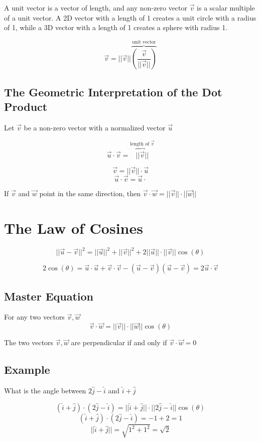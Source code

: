 \documentclass{article}
\begin{document}
A unit vector is a vector of length, and any non-zero vector $\vec{v}$ is 
a scalar multiple of a unit vector.
\newline
A 2D vector with a length of 1 creates a unit circle with a radius of 1, while 
a 3D vector with a length of 1 creates a sphere with radius 1.

\[ \vec{v}=||\vec{v}||\overbrace{(\frac{\vec{v}}{||\vec{v}||})}^{\mbox{unit vector}}\]

\subsection{The Geometric Interpretation of the Dot Product}
Let $\vec{v}$ be a non-zero vector with a normalized vector $\vec{u}$

\[ \vec{u}\cdot \vec{v}=\overbrace{||\vec{v}||}^{\mbox{length of $\vec{v}$}}\]

\[ \vec{v}=||\vec{v}||\cdot \vec{u}\]
\[ \vec{u}\cdot \vec{v}=\vec{u}\cdot \]

If $\vec{v}$ and $\vec{w}$ point in the same direction, then $\vec{v}\cdot 
\vec{w}=||\vec{v}||\cdot ||\vec{w}||$

\section{The Law of Cosines}
\[||\vec{u}-\vec{v}||^2 = ||\vec{u}||^2 + ||\vec{v}||^2 +2||\vec{u}||\cdot||\vec{v}||\cos(\theta) \]

\[ 2\cos(\theta)=\vec{u}\cdot\vec{u}+\vec{v}\cdot \vec{v}-(\vec{u}-\vec{v})(\vec{u}-\vec{v})=2\vec{u}\cdot \vec{v} \]

\subsection{Master Equation}
For any two vectors $\vec{v},\vec{w}$
\[\vec{v}\cdot \vec{w}=||\vec{v}||\cdot ||\vec{w}||\cos(\theta)\]

The two vectors $\vec{v},\vec{w}$ are perpendicular if and only if  $\vec{v}\cdot \vec{w}=0$

\subsection*{Example}
What is the angle between $2\hat{j}-\hat{i}$ and $\hat{i}+\hat{j}$

\[(\hat{i}+\hat{j})\cdot(2\hat{j}-\hat{i})=||\hat{i}+\hat{j}||\cdot ||2\hat{j}-\hat{i}||\cos(\theta) \]
\[(\hat{i}+\hat{j})\cdot(2\hat{j}-\hat{i})=-1+2=1 \]
\[||\hat{i}+\hat{j}||=\sqrt{1^2 +1^2}=\sqrt{2}\]
\end{document}
